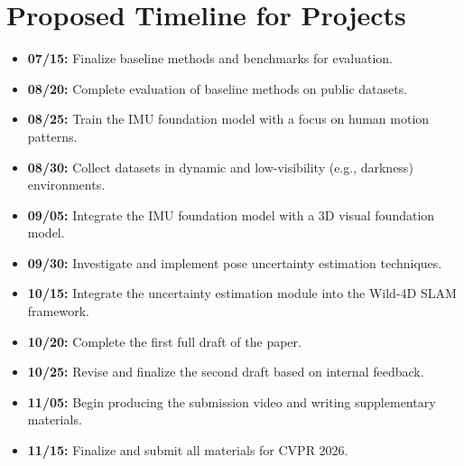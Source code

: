 \section{Proposed Timeline for Projects}

\begin{itemize}
    \item \textbf{07/15:} Finalize baseline methods and benchmarks for evaluation.
    \item \textbf{08/20:} Complete evaluation of baseline methods on public datasets.
    \item \textbf{08/25:} Train the IMU foundation model with a focus on human motion patterns.
    \item \textbf{08/30:} Collect datasets in dynamic and low-visibility (e.g., darkness) environments.
    \item \textbf{09/05:} Integrate the IMU foundation model with a 3D visual foundation model.
    \item \textbf{09/30:} Investigate and implement pose uncertainty estimation techniques.
    \item \textbf{10/15:} Integrate the uncertainty estimation module into the Wild-4D SLAM framework.
    \item \textbf{10/20:} Complete the first full draft of the paper.
    \item \textbf{10/25:} Revise and finalize the second draft based on internal feedback.
    \item \textbf{11/05:} Begin producing the submission video and writing supplementary materials.
    \item \textbf{11/15:} Finalize and submit all materials for CVPR 2026.
\end{itemize}